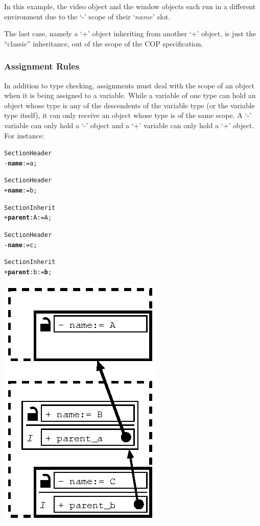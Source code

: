 \documentclass[11pt]{mybook}
\begin{document}
In this example, the {\sc{}video} object and the {\sc{}window} objects
each run in a different environment due to the `-' scope of their
`$name$' slot.

The last case, namely a `+' object inheriting from another `+' object,
is just the ``classic'' inheritance, out of the scope of the COP
specification. 


\subsubsection{Assignment Rules}

In addition to type checking, assignments must deal with the scope of
an object when it is being assigned to a variable.  While a variable
of one type can hold an object whose type is any of the descendents of
the variable type (or the variable type itself), it can only receive
an object whose type is of the same scope.  A `-' variable can only
hold a `-' object and a `+' variable can only hold a `+' object. For
instance: 

\begin{alltt}
Section Header
  - {\bf{}name} := {\sc{}a};


Section Header
  + {\bf{}name} := {\sc{}b};

Section Inherit
  + {\bf{}parent}:{\sc{}A} := {\sc{}A};


Section Header
  - {\bf{}name} := {\sc{}c};

Section Inherit
  + {\bf{}parent}:{\sc{}b} := {\bf{}b};
\end{alltt}

\begin{center}
  \includegraphics{figures/cop-assign.ps}
\end{center}
\end{document}
